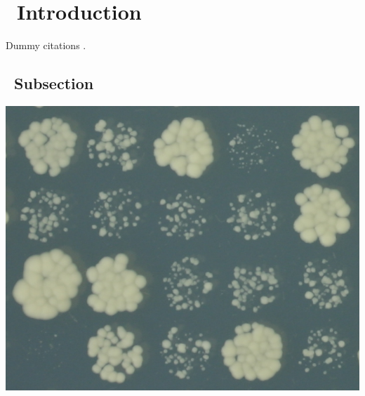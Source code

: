 \graphicspath{{images/}}

\section{\thesection~Introduction}
\label{sec:introduction}
Dummy \citet{Lawless2010} citations \citep{Heydari2016} \citep{Addinall2008}.

\subsection{\thesubsection~Subsection}

\begin{Figure}
  \centering
  \includegraphics[width=\linewidth]{p15_section/p15_section}
  \label{fig:p15_section}
\end{Figure}

